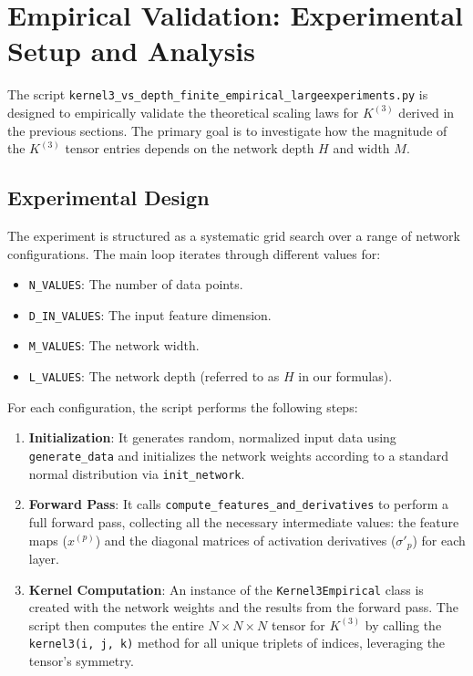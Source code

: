 \documentclass[a4paper]{article}
\begin{document}
\newpage

\section{Empirical Validation: Experimental Setup and Analysis}

The script \texttt{kernel3\_vs\_depth\_finite\_empirical\_largeexperiments.py} is designed to empirically validate the theoretical scaling laws for $K^{(3)}$ derived in the previous sections. The primary goal is to investigate how the magnitude of the $K^{(3)}$ tensor entries depends on the network depth $H$ and width $M$.

\subsection{Experimental Design}

The experiment is structured as a systematic grid search over a range of network configurations. The main loop iterates through different values for:
\begin{itemize}
    \item \texttt{N\_VALUES}: The number of data points.
    \item \texttt{D\_IN\_VALUES}: The input feature dimension.
    \item \texttt{M\_VALUES}: The network width.
    \item \texttt{L\_VALUES}: The network depth (referred to as $H$ in our formulas).
\end{itemize}

For each configuration, the script performs the following steps:
\begin{enumerate}
    \item \textbf{Initialization}: It generates random, normalized input data using \texttt{generate\_data} and initializes the network weights according to a standard normal distribution via \texttt{init\_network}.
    \item \textbf{Forward Pass}: It calls \texttt{compute\_features\_and\_derivatives} to perform a full forward pass, collecting all the necessary intermediate values: the feature maps ($x^{(p)}$) and the diagonal matrices of activation derivatives ($\sigma'_p$) for each layer.
    \item \textbf{Kernel Computation}: An instance of the \texttt{Kernel3Empirical} class is created with the network weights and the results from the forward pass. The script then computes the entire $N \times N \times N$ tensor for $K^{(3)}$ by calling the \texttt{kernel3(i, j, k)} method for all unique triplets of indices, leveraging the tensor's symmetry.
\end{enumerate}
\end{document}
